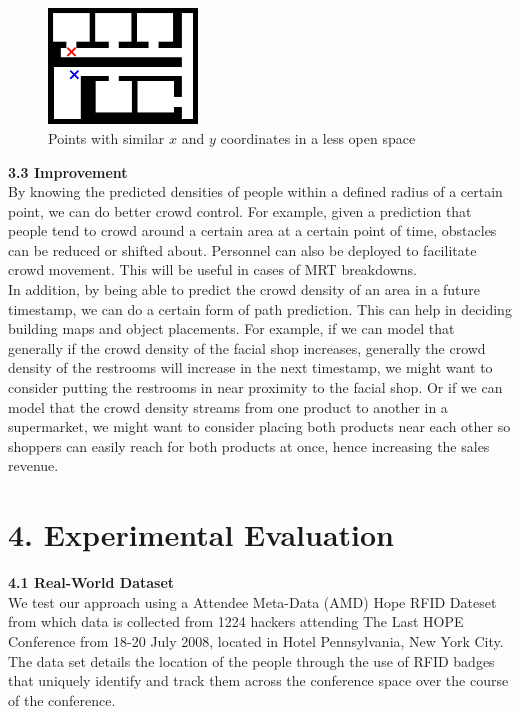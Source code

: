 \documentclass[letterpaper]{article}
\begin{document}
\begin{figure}[h!]
  \centering
    \includegraphics[width=150px,natwidth=570,natheight=442]{openspace2.png}
  \caption{Points with similar $x$ and $y$ coordinates in a less open space}
  \label{fig:opspace2}
\end{figure}

{\bf3.3  Improvement} \\

By knowing the predicted densities of people within a defined radius of a certain point, we can do better crowd control. For example, given a prediction that people tend to crowd around a certain area at a certain point of time, obstacles can be reduced or shifted about. Personnel can also be deployed to facilitate crowd movement. This will be useful in cases of MRT breakdowns. \\

In addition, by being able to predict the crowd density of an area in a future timestamp, we can do a certain form of path prediction. This can help in deciding building maps and object placements. For example, if we can model that generally if the crowd density of the facial shop increases, generally the crowd density of the restrooms will increase in the next timestamp, we might want to consider putting the restrooms in near proximity to the facial shop. Or if we can model that the crowd density streams from one product to another in a supermarket, we might want to consider placing both products near each other so shoppers can easily reach for both products at once, hence increasing the sales revenue.  \\

\section{4.  Experimental Evaluation}

{\bf4.1  Real-World Dataset} \\

We test our approach using a Attendee Meta-Data (AMD) Hope RFID Dateset from which data is collected from 1224 hackers attending The Last HOPE Conference from 18-20 July 2008, located in Hotel Pennsylvania, New York City. The data set details the location of the people through the use of RFID badges that uniquely identify and track them across the conference space over the course of the conference. \\
\end{document}
